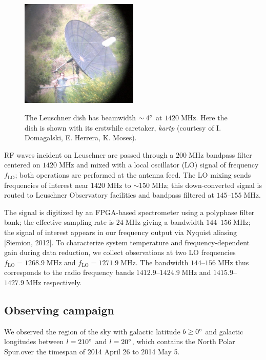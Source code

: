 \documentclass[10pt]{article}
\newcommand {\mt}{\mathrm}
\newcommand {\unit}[1]{\; \mt{#1}}
\begin{document}
\begin{figure}[!ht]
    \centering
    \includegraphics[width=0.5\textwidth]{kartp.png} \\
    \caption{The Leuschner dish has beamwidth $\sim 4 \degree$ at $1420 \unit{MHz}$.  Here the dish is shown with its erstwhile caretaker, \emph{kartp} (courtesy of I. Domagalski, E. Herrera, K. Moses).}
    \label{fig:kartp}
\end{figure}

RF waves incident on Leuschner are passed through a $200 \unit{MHz}$ bandpass filter centered on $1420 \unit{MHz}$ and mixed with a local oscillator (LO) signal of frequency $f_{\mt{LO}}$; both operations are performed at the antenna feed.  The LO mixing sends frequencies of interest near $1420 \unit{MHz}$ to $\sim150 \unit{MHz}$; this down-converted signal is routed to Leuschner Observatory facilities and bandpass filtered at $145$--$155 \unit{MHz}$.

The signal is digitized by an FPGA-based spectrometer using a polyphase filter bank; the effective sampling rate is $24 \unit{MHz}$ giving a bandwidth $144$--$156 \unit{MHz}$; the signal of interest appears in our frequency output via Nyquist aliasing [Siemion, 2012].  To characterize system temperature and frequency-dependent gain during data reduction, we collect observations at two LO frequencies $f_{\mt{LO}} = 1268.9 \unit{MHz}$ and $f_{\mt{LO}} = 1271.9 \unit{MHz}$.  The bandwidth $144$--$156 \unit{MHz}$ thus corresponds to the radio frequency bands $1412.9$--$1424.9 \unit{MHz}$ and $1415.9$--$1427.9 \unit{MHz}$ respectively.

\subsection{Observing campaign}

We observed the region of the sky with galactic latitude $b\geq 0\degree$ and galactic longitudes between $l=210\degree$ and $l=20\degree$, which contains the North Polar Spur.over the timespan of 2014 April 26 to 2014 May 5.
\end{document}
